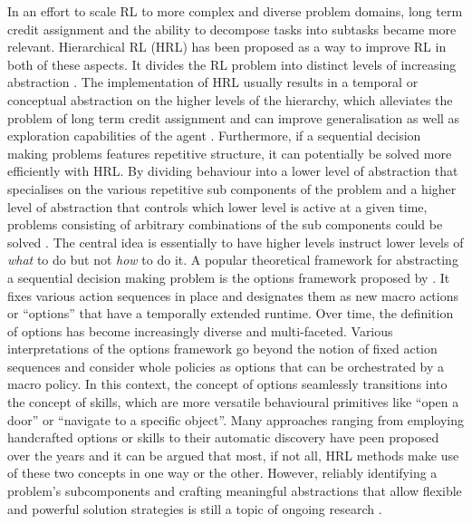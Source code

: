 \documentclass{article}
\begin{document}
In an effort to scale RL to more complex and diverse problem domains, long term credit assignment and the ability to decompose tasks into subtasks became more relevant.
Hierarchical RL (HRL) has been proposed as a way to improve RL in both of these aspects. 
It divides the RL problem into distinct levels of increasing abstraction \citep{fikes1972learning, korf1985learning, schmidhuber1991neural, sutton1995modeling, sutton1999between, botvinick2014modelbased, vezhnevets2017feudal}.
The implementation of HRL usually results in a temporal or conceptual abstraction on the higher levels of the hierarchy, which alleviates the problem of long term credit assignment and can improve generalisation as well as exploration capabilities of the agent \citep{singh1992reinforcement, li2017efficient, florensa2017stochastic, xie2021latent}.
Furthermore, if a sequential decision making problems features repetitive structure, it can potentially be solved more efficiently with HRL.
By dividing behaviour into a lower level of abstraction that specialises on the various repetitive sub components of the problem and a higher level of abstraction that controls which lower level is active at a given time, problems consisting of arbitrary combinations of the sub components could be solved \citep{singh1992reinforcement, krishnamurthy2016hierarchical, florensa2017stochastic, xie2021latent}.
The central idea is essentially to have higher levels instruct lower levels of \textit{what} to do but not \textit{how} to do it. 
A popular theoretical framework for abstracting a sequential decision making problem is the options framework proposed by \citet{sutton1999between}.
It fixes various action sequences in place and designates them as new macro actions or ``options'' that have a temporally extended runtime. 
Over time, the definition of options has become increasingly diverse and multi-faceted.
Various interpretations of the options framework go beyond the notion of fixed action sequences and consider whole policies as options that can be orchestrated by a macro policy. 
In this context, the concept of options seamlessly transitions into the concept of skills, which are more versatile behavioural primitives like ``open a door'' or ``navigate to a specific object''.
Many approaches ranging from employing handcrafted options or skills to their automatic discovery have peen proposed over the years \citep{sutton1999between, mcgovern2001automatic, isahi2002qcut, simsek2004using, simsek2005identifying, konidaris2009skill, daniel2013autonomous, gregor2016variational, ramesh2019successor} and it can be argued that most, if not all, HRL methods make use of these two concepts in one way or the other.
However, reliably identifying a problem's subcomponents and crafting meaningful abstractions that allow flexible and powerful solution strategies is still a topic of ongoing research \citep{pateria2021hierarchical}.
\end{document}

